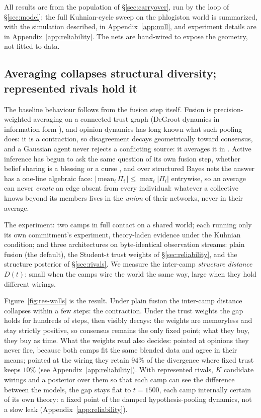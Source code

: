 \documentclass[runningheads]{llncs}
\begin{document}
All results are from the population of \S\ref{sec:carryover}, run by the loop of
\S\ref{sec:model}; the full Kuhnian-cycle sweep on the phlogiston world is summarized, with
the simulation described, in Appendix~\ref{app:null}, and experiment details are in
Appendix~\ref{app:reliability}. The nets are hand-wired to expose the geometry, not fitted to
data.

\subsection{Averaging collapses structural diversity; represented rivals hold it}
\label{sec:res-homogeneity}
\label{sec:res-distinct}

The baseline behaviour follows from the fusion step itself. Fusion is precision-weighted
averaging on a connected trust graph (DeGroot dynamics in information form
\citep{degroot1974,acemoglu2011}), and opinion dynamics has long known what such pooling
does: it is a contraction, so disagreement decays geometrically toward consensus, and a
Gaussian agent never rejects a conflicting source: it averages it in
\citep{dawid1973,ohagan1979,ohagan2012}. Active inference has begun to ask the same question
of its own fusion step, whether belief sharing is a blessing or a curse
\citep{catal2024}, and over structured Bayes nets the answer has a one-line algebraic face:
$|\,\mathrm{mean}_i\,\Pi_i\,|\le\max_i|\Pi_i|$ entrywise, so an
average can never \emph{create} an edge absent from every individual: whatever a collective
knows beyond its members lives in the \emph{union} of their networks, never in their
average.

The experiment: two camps in full contact on a shared world; each running only its own
commitment's experiment, theory-laden evidence under the Kuhnian condition; and three
architectures on byte-identical observation streams: plain fusion (the default), the
Student-$t$ trust weights of \S\ref{sec:reliability}, and the structure posterior of
\S\ref{sec:rivals}. We measure the inter-camp \emph{structure distance} $D(t)$: small when
the camps wire the world the same way, large when they hold different wirings.

Figure~\ref{fig:res-walls} is the result. Under plain fusion the inter-camp distance
collapses within a few steps: the contraction. Under the trust weights the gap holds for
hundreds of steps, then visibly decays: the weights are memoryless and stay strictly
positive, so consensus remains the only fixed point; what they buy, they buy as time. What
the weights read also decides: pointed at opinions they never fire, because both camps
fit the same blended data and agree in their means; pointed at the wiring they retain $94\%$
of the divergence where fixed trust keeps $10\%$ (see Appendix~\ref{app:reliability}). With
represented rivals, $K$ candidate wirings and a posterior over them so that each camp can see
the difference between the models, the gap stays
flat to $t=1500$, each camp internally certain of its own theory: a fixed point of the damped
hypothesis-pooling dynamics, not a slow leak (Appendix~\ref{app:reliability}).
\end{document}

